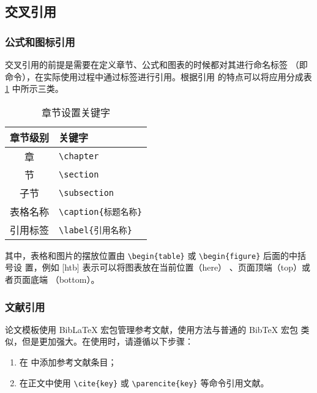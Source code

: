 \subsection{交叉引用}

\subsubsection{公式和图标引用}

交叉引用的前提是需要在定义章节、公式和图表的时候都对其进行命名标签
（即\label{sec:labelName} 命令），在实际使用过程中通过标签进行引用。根据引用
的特点可以将应用分成表 \ref{tab:setSection} 中所示三类。

\begin{table}[htb]
 \centering
  \caption{章节设置关键字}     %
  \label{tab:setSection}    %
  \begin{tabular}{cl}
    \hline
    章节级别        & 关键字     \\
    \hline
     章        & \verb|\chapter| \\
     节        & \verb|\section | \\
    子节      & \verb|\subsection |\\
    表格名称       & \verb|\caption{标题名称}| \\
    引用标签       & \verb|\label{引用名称}| \\
    \hline
  \end{tabular}
\end{table}


其中，表格和图片的摆放位置由 \verb|\begin{table}| 或 \verb|\begin{figure}| 后面的中括号设
置，例如 [htb] 表示可以将图表放在当前位置（here）
、页面顶端（top）或者页面底端
（bottom）。

\subsubsection{文献引用}

\BIThesis 论文模板使用 BibLaTeX 宏包管理参考文献，使用方法与普通的 BibTeX 宏包
类似，但是更加强大。在使用时，请遵循以下步骤：
\begin{enumerate}
  \item 在 \texttt{} 中添加参考文献条目；
  \item 在正文中使用 \verb|\cite{key}| 或 \verb|\parencite{key}| 等命令引用文献。
\end{enumerate}


